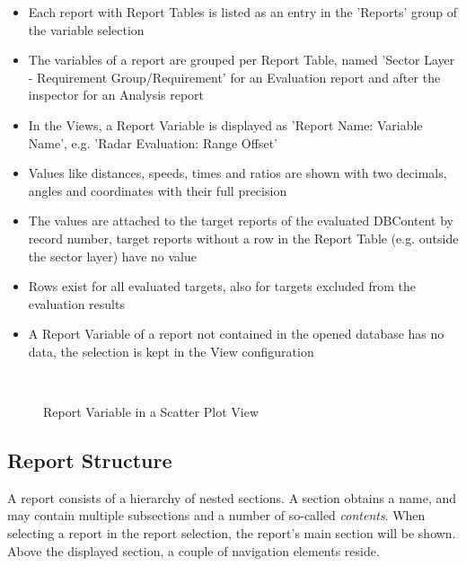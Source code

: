 \begin{itemize}
\item Each report with Report Tables is listed as an entry in the 'Reports' group of the variable selection
\item The variables of a report are grouped per Report Table, named 'Sector Layer - Requirement Group/Requirement' for an Evaluation report and after the inspector for an Analysis report
\item In the Views, a Report Variable is displayed as 'Report Name: Variable Name', e.g. 'Radar Evaluation: Range Offset'
\item Values like distances, speeds, times and ratios are shown with two decimals, angles and coordinates with their full precision
\item The values are attached to the target reports of the evaluated DBContent by record number, target reports without a row in the Report Table (e.g. outside the sector layer) have no value
\item Rows exist for all evaluated targets, also for targets excluded from the evaluation results
\item A Report Variable of a report not contained in the opened database has no data, the selection is kept in the View configuration
\end{itemize}
\ \\

\begin{figure}[H]
  \center
  \caption{Report Variable in a Scatter Plot View}
\end{figure}

\subsection{Report Structure}

A report consists of a hierarchy of nested sections. 
A section obtains a name, and may contain multiple subsections and a number of so-called \textit{contents}.
When selecting a report in the report selection, the report's main section will be shown. \\

Above the displayed section, a couple of navigation elements reside.

